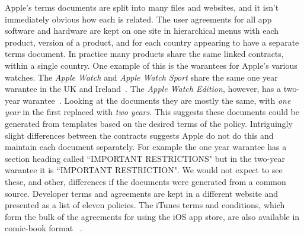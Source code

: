 \documentclass[thesis.tex]{subfiles}
\begin{document}
Apple's terms documents are split into many files and websites, and it isn't immediately obvious how each is related.
The user agreements for all app software and hardware are kept on one site in hierarchical menus with each product, version of a product, and for each country appearing to have a separate terms document.  In practice many products share the same linked contracts, within a single country.
One example of this is the warantees for Apple's various watches.  The \emph{Apple Watch} and \emph{Apple Watch Sport} share the same one year warantee in the UK and Ireland~\cite{apple_apple_nodate}.
The \emph{Apple Watch Edition}, however, has a two-year warantee~\cite{apple_apple_nodate-1}.  Looking at the documents they are mostly the same, with \emph{one year} in the first replaced with \emph{two years}.  This suggests these documents could be generated from templates based on the desired terms of the policy.  Intriguingly slight differences between the contracts suggests Apple do not do this and maintain each document separately.  For example the one year warantee has a section heading called ``IMPORTANT RESTRICTIONS" but in the two-year warantee it is ``IMPORTANT RESTRICTION".  We would not expect to see these, and other, differences if the documents were generated from a common source.
Developer terms and agreements are kept in a different website and presented as a list of eleven policies.
The iTunes terms and conditions, which form the bulk of the agreements for using the iOS app store, are also available in comic-book format ~\cite{r._sikoryak_terms_2017}. 
\end{document}
